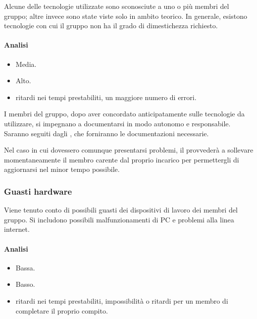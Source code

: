 \documentclass[a4paper, titlepage]{article}
\begin{document}
	Alcune delle tecnologie utilizzate sono sconosciute a uno o più membri del gruppo; altre invece sono state viste solo in ambito teorico. In generale, esistono tecnologie con cui il gruppo non ha il grado di dimestichezza richiesto.

	\paragraph {Analisi}
	\begin{itemize}
		\item {} Media.
		\item {} Alto.
		\item {} ritardi nei tempi prestabiliti, un maggiore numero di errori.
	\end{itemize}
	
	I membri del gruppo, dopo aver concordato anticipatamente sulle tecnologie da utilizzare, si impegnano a documentarsi in modo autonomo e responsabile. Saranno seguiti dagli , che forniranno le documentazioni necessarie.
	
	 Nel caso in cui dovessero comunque presentarsi problemi, il  provvederà a sollevare momentaneamente il membro carente dal proprio incarico per permettergli di aggiornarsi nel minor tempo possibile. 
	
	
	\subsubsection{Guasti hardware}
	Viene tenuto conto di possibili guasti dei dispositivi di lavoro dei membri del gruppo. Si includono possibili malfunzionamenti di PC e problemi alla linea internet.
	
	\paragraph {Analisi}
	\begin{itemize}
		\item {} Bassa.
		\item {} Basso.
		\item {} ritardi nei tempi prestabiliti, impossibilità o ritardi per un membro di completare il proprio compito.
	\end{itemize}
	
\end{document}
